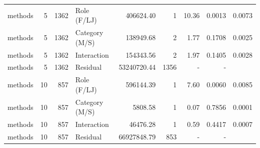 \begin{table}[H]
{\begin{tabular}{l r r l r r r r r}
methods & 5 & 1362 & Role (F/LJ) & 406624.40 & 1 & 10.36 & 0.0013 & 0.0073 \\ 
methods & 5 & 1362 & Category (M/S) & 138949.68 & 2 & 1.77 & 0.1708 & 0.0025 \\ 
methods & 5 & 1362 & Interaction & 154343.56 & 2 & 1.97 & 0.1405 & 0.0028 \\ 
methods & 5 & 1362 & Residual & 53240720.44 & 1356 & - & -  \\ 
methods & 10 & 857 & Role (F/LJ) & 596144.39 & 1 & 7.60 & 0.0060 & 0.0085 \\ 
methods & 10 & 857 & Category (M/S) & 5808.58 & 1 & 0.07 & 0.7856 & 0.0001 \\ 
methods & 10 & 857 & Interaction & 46476.28 & 1 & 0.59 & 0.4417 & 0.0007 \\ 
methods & 10 & 857 & Residual & 66927848.79 & 853 & - & -  \\ 
\bottomrule
\end{tabular}%
} 
\label{tab:codebase_graph_latex_repository_graph_component_time_series_generated_standard_anova} 
\end{table}
\newpage 
